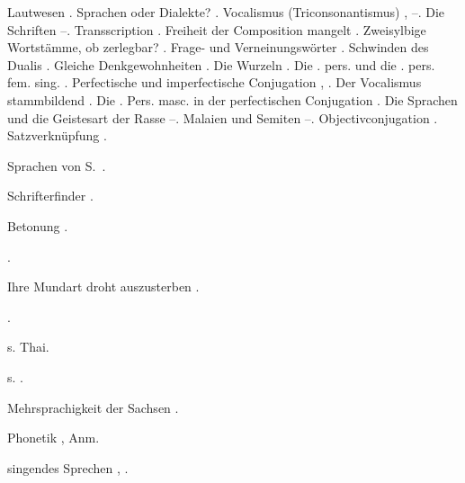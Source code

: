 \begin{register}
 Lautwesen \pageref{sp.34}. Sprachen oder Dialekte? \pageref{sp.54}. Vocalismus (Triconsonantismus) \pageref{sp.122}, \pageref{sp.148}–\pageref{sp.149}. Die Schriften \pageref{sp.129}–\pageref{sp.130}. Transscription \pageref{sp.134}.  Freiheit der Composition mangelt \pageref{sp.236}. Zweisylbige Wortstämme, ob zerlegbar? \pageref{sp.242}. Frage- und Verneinungswörter \pageref{sp.244}. Schwinden des Dualis \pageref{sp.254}. Gleiche Denkgewohnheiten \pageref{sp.293}. Die Wurzeln \pageref{sp.295}.  Die \pageref{sp.2}. pers.  und die \pageref{sp.3}. pers. fem. sing. \pageref{sp.307}.  Perfectische und imperfectische Conjugation \pageref{sp.372}, \pageref{sp.391}. Der Vocalismus stammbildend \pageref{sp.391}. Die \pageref{sp.3}. Pers. masc. in der perfectischen Conjugation \pageref{sp.392}.  Die Sprachen und die Geistesart der Rasse \pageref{sp.408}–\pageref{sp.411}. Malaien und Semiten \pageref{sp.411}–\pageref{sp.415}. Objectivconjugation \pageref{sp.462}. Satzverknüpfung \pageref{sp.465}.


 Sprachen von S.~\pageref{sp.150}.

 Schrifterfinder \pageref{sp.131}.

 Betonung \pageref{sp.431}.

 \pageref{sp.157}.


 Ihre Mundart droht auszusterben \pageref{sp.146}.

 \pageref{sp.149}.

 s. Thai.

 s. .

 Mehrsprachigkeit der Sachsen \pageref{sp.70}.

 Phonetik \pageref{sp.38}, Anm.

 singendes Sprechen \pageref{sp.33}, \pageref{sp.34}.


\end{register}

